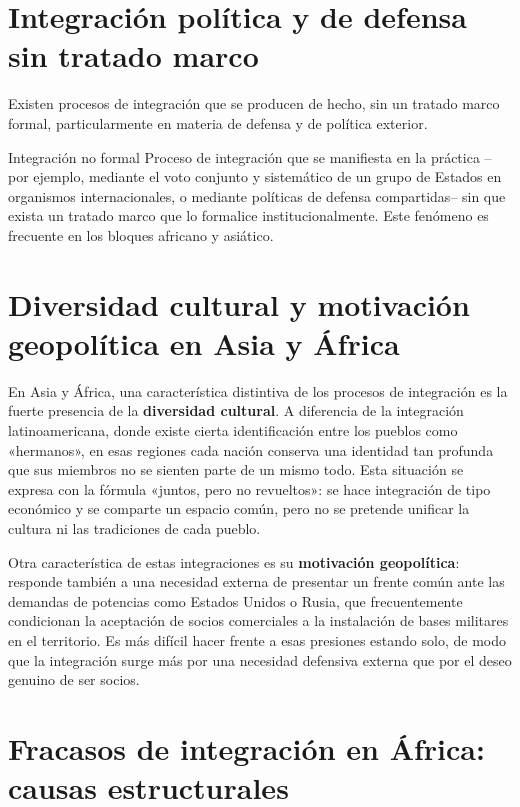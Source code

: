 \documentclass[12pt,oneside]{book}
\begin{document}
\section{Integración política y de defensa sin tratado marco}

Existen procesos de integración que se producen de hecho, sin un tratado marco formal, particularmente en materia de defensa y de política exterior.

\begin{definicion}{Integración no formal}
Proceso de integración que se manifiesta en la práctica --por ejemplo, mediante el voto conjunto y sistemático de un grupo de Estados en organismos internacionales, o mediante políticas de defensa compartidas-- sin que exista un tratado marco que lo formalice institucionalmente. Este fenómeno es frecuente en los bloques africano y asiático.
\end{definicion}

\section{Diversidad cultural y motivación geopolítica en Asia y África}

En Asia y África, una característica distintiva de los procesos de integración es la fuerte presencia de la \textbf{diversidad cultural}. A diferencia de la integración latinoamericana, donde existe cierta identificación entre los pueblos como «hermanos», en esas regiones cada nación conserva una identidad tan profunda que sus miembros no se sienten parte de un mismo todo. Esta situación se expresa con la fórmula «juntos, pero no revueltos»: se hace integración de tipo económico y se comparte un espacio común, pero no se pretende unificar la cultura ni las tradiciones de cada pueblo.

Otra característica de estas integraciones es su \textbf{motivación geopolítica}: responde también a una necesidad externa de presentar un frente común ante las demandas de potencias como Estados Unidos o Rusia, que frecuentemente condicionan la aceptación de socios comerciales a la instalación de bases militares en el territorio. Es más difícil hacer frente a esas presiones estando solo, de modo que la integración surge más por una necesidad defensiva externa que por el deseo genuino de ser socios.

\section{Fracasos de integración en África: causas estructurales}
\end{document}
